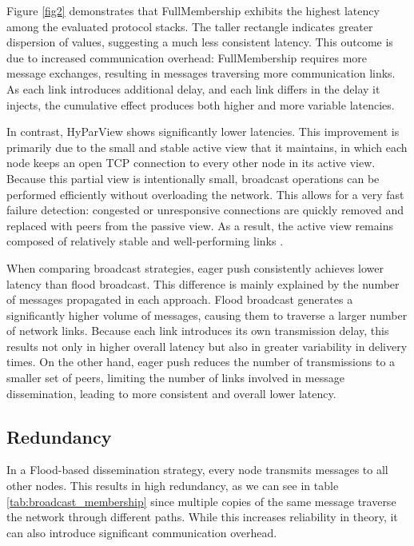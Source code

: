 \documentclass[sigconf,a4paper]{acmart}
\begin{document}
Figure \ref{fig2} demonstrates that FullMembership exhibits the highest latency among the evaluated 
protocol stacks. The taller rectangle indicates greater dispersion of values, suggesting a much 
less consistent latency. This outcome is due to increased communication overhead: FullMembership 
requires more message exchanges, resulting in messages traversing more communication links. As 
each link introduces additional delay, and each link differs in the delay it injects, the 
cumulative effect produces both higher and more variable latencies.

In contrast, HyParView shows significantly lower latencies. This improvement is primarily due 
to the small and stable active view that it maintains, in which each node keeps an open TCP 
connection to every other node in its active view. Because this partial view is intentionally 
small, broadcast operations can be performed efficiently without overloading the network. 
This allows for a very fast failure detection: congested or unresponsive connections are 
quickly removed and replaced with peers from the passive view. As a result, the active 
view remains composed of relatively stable and well-performing links \cite{hyparview}.

When comparing broadcast strategies, eager push consistently achieves lower latency than 
flood broadcast. This difference is mainly explained by the number of messages propagated 
in each approach. Flood broadcast generates a significantly higher volume of messages, 
causing them to traverse a larger number of network links. Because each link introduces 
its own transmission delay, this results not only in higher overall latency but also in 
greater variability in delivery times. On the other hand, eager push reduces the number 
of transmissions to a smaller set of peers, limiting the number of links involved in message 
dissemination, leading to more consistent and overall lower latency.

\subsection{Redundancy}

In a Flood-based dissemination strategy, every node transmits messages to all other nodes. 
This results in high redundancy, as we can see in table \ref{tab:broadcast_membership} since multiple copies of the same message traverse the network 
through different paths. While this increases reliability in theory, it can also introduce 
significant communication overhead.
\end{document}

